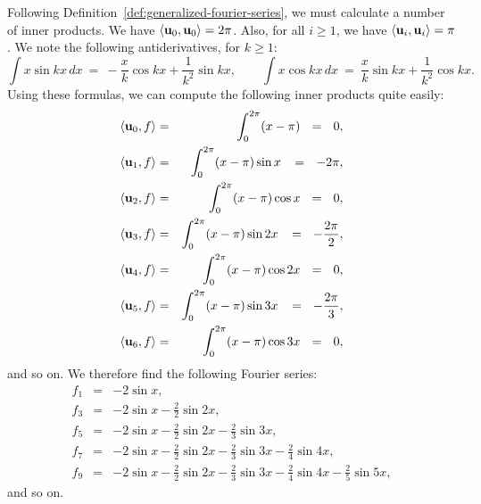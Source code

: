 \begin{solution}
  Following Definition~\ref{def:generalized-fourier-series}, we must
  calculate a number of inner products. We have
  $\iprod{\vect{u}_0,\vect{u}_0}=2\pi$. Also, for all $i\geq 1$, we
  have $\iprod{\vect{u}_i,\vect{u}_i}=\pi$. We note the following
  antiderivatives, for $k\geq 1$:
  \begin{equation*}
    \int x\sin kx\,dx ~=~ -\frac{x}{k}\cos kx + \frac{1}{k^2}\sin kx, \qquad
    \int x\cos kx\,dx ~=~ \frac{x}{k}\sin kx + \frac{1}{k^2}\cos kx.
  \end{equation*}
  Using these formulas, we can compute the following inner products
  quite easily:
  \begin{eqnarray*}
    \iprod{\vect{u}_0, f}
    &=& \int_{0}^{2\pi} (x-\pi)
        ~~=~~ 0, \\
    \iprod{\vect{u}_1, f}
    &=& \int_{0}^{2\pi} (x-\pi)\sin x
        \,~~=~~ -2\pi, \\
    \iprod{\vect{u}_2, f}
    &=& \int_{0}^{2\pi} (x-\pi)\cos x
        ~~=~~ 0, \\
    \iprod{\vect{u}_3, f}
    &=& \int_{0}^{2\pi} (x-\pi)\sin 2x
        \,~~=~~ -\frac{2\pi}{2}, \\
    \iprod{\vect{u}_4, f}
    &=& \int_{0}^{2\pi} (x-\pi)\cos 2x
        ~~=~~ 0, \\
    \iprod{\vect{u}_5, f}
    &=& \int_{0}^{2\pi} (x-\pi)\sin 3x
        \,~~=~~ -\frac{2\pi}{3}, \\
    \iprod{\vect{u}_6, f}
    &=& \int_{0}^{2\pi} (x-\pi)\cos 3x
        ~~=~~ 0,
  \end{eqnarray*}
  and so on. We therefore find the following Fourier series:
  \begin{eqnarray*}
    f_1 &=& -2 \sin x, \\
    f_3 &=& -2 \sin x - \frac{2}{2}\sin 2x, \\
    f_5 &=& -2 \sin x - \frac{2}{2}\sin 2x - \frac{2}{3}\sin 3x, \\
    f_7 &=& -2 \sin x - \frac{2}{2}\sin 2x - \frac{2}{3}\sin 3x - \frac{2}{4}\sin 4x, \\
    f_9 &=& -2 \sin x - \frac{2}{2}\sin 2x - \frac{2}{3}\sin 3x - \frac{2}{4}\sin 4x - \frac{2}{5}\sin 5x,
  \end{eqnarray*}
  and so on. 
\end{solution}

